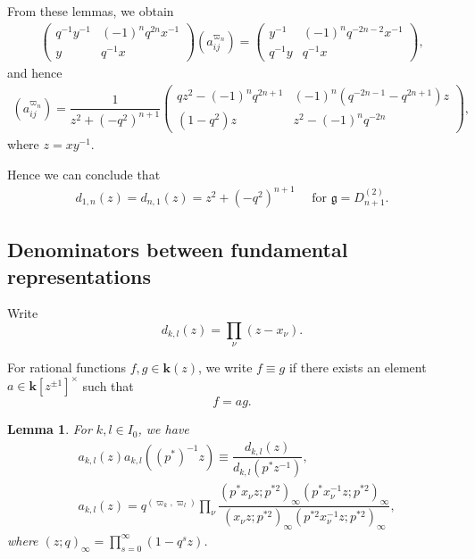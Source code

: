 \documentclass[11pt, leqno]{amsart}
\newtheorem{lemma}[theorem]{Lemma}
\theoremstyle{definition}
\numberwithin{equation}{section}
\begin{document}
From these lemmas, we obtain
\begin{align*}
 \left( \begin{matrix} q^{-1} y^{-1} & (-1)^n q^{2n}x^{-1} \\ y & q^{-1} x \end{matrix} \right) (a_{ij}^{\varpi_n})
=  \left( \begin{matrix} y^{-1} & (-1)^n q^{-2n-2} x^{-1} \\ q^{-1}y & q^{-1} x \end{matrix} \right),
\end{align*}
and hence
\begin{align*}
(a_{ij}^{\varpi_n}) = \dfrac{1}{z^2 + {(-q^2)}^{n+1}}
\left( \begin{matrix} qz^2 - (-1)^n q^{2n+1}  & (-1)^n (q^{-2n-1} - q^{2n+1}) z
 \\ (1-q^2)z& z^{2} - (-1)^{n} q^{-2n} \end{matrix} \right),
\end{align*} where $z=xy^{-1}$.

Hence we can conclude that
\begin{align} \label{eq:deno1n D}
  d_{1,n}(z)=d_{n,1}(z)= z^2+{(-q^2)}^{n+1}  \quad \text{ for } {\mathfrak g} = D^{(2)}_{n+1}.
\end{align}

\subsection{Denominators between fundamental representations} Write
$$ d_{k,l}(z) =  \prod_{\nu}(z- x_\nu).$$

For rational functions $f,g \in {\mathbf{k}}(z)$, we write $f \equiv g$ if there exists an element $a \in {\mathbf{k}}[z^{\pm 1}]^\times$ such that
$$ f = ag.$$

\begin{lemma} \label{Lem: aij and dij} \cite{AK}
For $k,l \in I_0$, we have
\begin{equation} \label{eq: aij and dij}
\begin{aligned}
& a_{k,l}(z)a_{k,l}((p^*)^{-1}z)\equiv
\dfrac{d_{k,l}(z)}{d_{k,l}(p^*z^{-1})},\\
 & a_{k,l}(z)
 = q^{(\varpi_k , \varpi_l)}
 \prod_{\nu}\dfrac{(p^* x_\nu z; p^{*2})_\infty
 (p^* x_\nu^{-1} z; p^{*2})_\infty}
  {(x_\nu z; p^{*2})_\infty (p^{*2} x_\nu^{-1} z; p^{*2})_\infty},
\end{aligned}
\end{equation}
where $(z;q)_\infty= \prod_{s=0}^\infty (1-q^sz)$.
\end{lemma}
\end{document}

